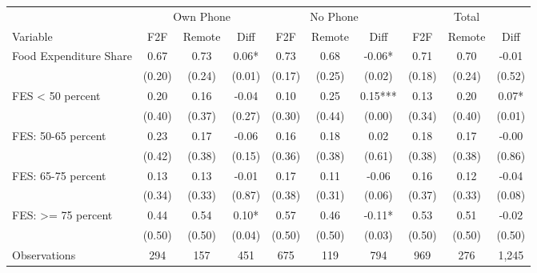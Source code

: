 \begin{tabular}{l*{9}c}
\hline\hline
 & \multicolumn{3}{c}{Own Phone} & \multicolumn{3}{c}{No Phone} & \multicolumn{3}{c}{Total}\\ 
Variable & F2F & Remote & Diff & F2F & Remote & Diff & F2F & Remote & Diff \\
\hline
Food Expenditure Share&0.67&0.73&0.06*&0.73&0.68&-0.06*&0.71&0.70&-0.01\\
&(0.20)&(0.24)&(0.01)&(0.17)&(0.25)&(0.02)&(0.18)&(0.24)&(0.52)\\
FES < 50 percent&0.20&0.16&-0.04&0.10&0.25&0.15***&0.13&0.20&0.07*\\
&(0.40)&(0.37)&(0.27)&(0.30)&(0.44)&(0.00)&(0.34)&(0.40)&(0.01)\\
FES: 50-65 percent&0.23&0.17&-0.06&0.16&0.18&0.02&0.18&0.17&-0.00\\
&(0.42)&(0.38)&(0.15)&(0.36)&(0.38)&(0.61)&(0.38)&(0.38)&(0.86)\\
FES: 65-75 percent&0.13&0.13&-0.01&0.17&0.11&-0.06&0.16&0.12&-0.04\\
&(0.34)&(0.33)&(0.87)&(0.38)&(0.31)&(0.06)&(0.37)&(0.33)&(0.08)\\
FES: >= 75 percent&0.44&0.54&0.10*&0.57&0.46&-0.11*&0.53&0.51&-0.02\\
&(0.50)&(0.50)&(0.04)&(0.50)&(0.50)&(0.03)&(0.50)&(0.50)&(0.50)\\
\hline
Observations & 294 & 157 & 451 & 675 & 119 & 794 & 969 & 276 & 1,245 \\
\hline\hline
\end{tabular}
